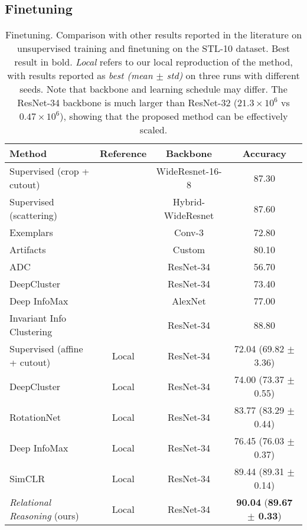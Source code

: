 \documentclass{article}
\begin{document}
\subsection{Finetuning}\label{appendix:additional_finetuning}

\begin{table}[H]
 \caption{Finetuning. Comparison with other results reported in the literature on unsupervised training and finetuning on the STL-10 dataset. Best result in bold. \emph{Local} refers to our local reproduction of the method, with results reported as \emph{best (mean $\pm$ std)} on three runs with different seeds. Note that backbone and learning schedule may differ. The ResNet-34 backbone is much larger than ResNet-32 ($21.3 \times 10^{6}$ vs $0.47 \times 10^{6}$), showing that the proposed method can be effectively scaled.}
 \label{tab:additional_finetuning}
 \begin{adjustbox}{width=1.0\columnwidth,center}
  \centering
  \begin{tabular}{lccc}
    \toprule
    \cmidrule[0.1pt](r){1-4}
    \textbf{Method} & \textbf{Reference} &
    \textbf{Backbone} & \textbf{Accuracy} \\
    \midrule
    Supervised (crop + cutout) & \cite{devries2017improved} &
    WideResnet-16-8  & 87.30\\
    Supervised (scattering) & \cite{oyallon2017scaling} &
    Hybrid-WideResnet  & 87.60\\
    Exemplars \citep{dosovitskiy2014discriminative} & \cite{dosovitskiy2014discriminative} & Conv-3 & 72.80\\
    Artifacts \citep{jenni2018self} & \cite{jenni2018self} & Custom & 80.10\\
    ADC \citep{haeusser2018associative} & \cite{ji2019invariant} & ResNet-34 & 56.70 \\
    DeepCluster \citep{caron2018deep} & \cite{ji2019invariant} &
    ResNet-34  & 73.40\\
    Deep InfoMax \citep{hjelm2018learning} & \cite{ji2019invariant} &
    AlexNet  & 77.00\\
    Invariant Info Clustering \citep{ji2019invariant} & \cite{ji2019invariant} & ResNet-34 & 88.80\\
Supervised (affine + cutout) & Local &
    ResNet-34  & 72.04 (69.82 $\pm$ \small{3.36})\\
    DeepCluster \citep{caron2018deep} & Local &
    ResNet-34  & 74.00 (73.37 $\pm$ \small{0.55})\\
    RotationNet \citep{gidaris2018unsupervised} & Local &
    ResNet-34  & 83.77 (83.29 $\pm$ \small{0.44})\\
    Deep InfoMax \citep{hjelm2018learning} & Local &
    ResNet-34  & 76.45 (76.03 $\pm$ \small{0.37})\\
    SimCLR \citep{chen2020simple} & Local &
    ResNet-34  & 89.44 (89.31 $\pm$ \small{0.14})\\    
    \emph{Relational Reasoning} (ours) & Local &
    ResNet-34  & \textbf{90.04} (\textbf{89.67 $\pm$ \small{0.33}})\\
    \bottomrule
  \end{tabular}
 \end{adjustbox}
\end{table}
\end{document}
